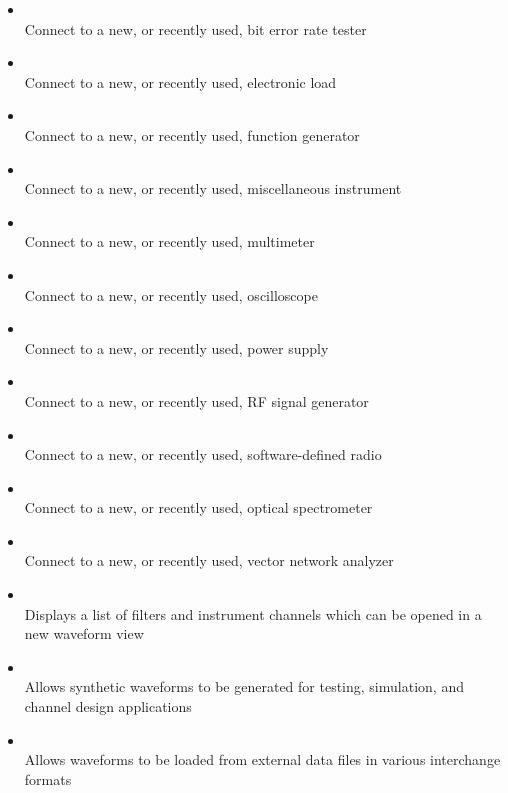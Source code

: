 \begin{itemize}

\item {}\\
Connect to a new, or recently used, bit error rate tester

\item {}\\
Connect to a new, or recently used, electronic load

\item {}\\
Connect to a new, or recently used, function generator

\item {}\\
Connect to a new, or recently used, miscellaneous instrument

\item {}\\
Connect to a new, or recently used, multimeter

\item {}\\
Connect to a new, or recently used, oscilloscope

\item {}\\
Connect to a new, or recently used, power supply

\item {}\\
Connect to a new, or recently used, RF signal generator

\item {}\\
Connect to a new, or recently used, software-defined radio

\item {}\\
Connect to a new, or recently used, optical spectrometer

\item {}\\
Connect to a new, or recently used, vector network analyzer

\item {}\\
Displays a list of filters and instrument channels which can be opened in a new waveform view

\item {}\\
Allows synthetic waveforms to be generated for testing, simulation, and channel design applications

\item {}\\
Allows waveforms to be loaded from external data files in various interchange formats

\end{itemize}

